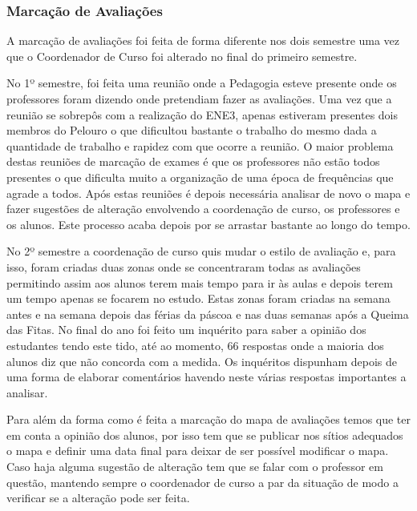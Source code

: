 
\subsubsection{Marcação de Avaliações}

A marcação de avaliações foi feita de forma diferente nos dois semestre uma vez que o Coordenador de Curso foi alterado no final do primeiro semestre.

No 1º semestre, foi feita uma reunião onde a Pedagogia esteve presente onde os professores foram dizendo onde pretendiam fazer as avaliações. Uma vez que a reunião se sobrepôs com a realização do ENE3, apenas estiveram presentes dois membros do Pelouro o que dificultou bastante o trabalho do mesmo dada a quantidade de trabalho e rapidez com que ocorre a reunião. O maior problema destas reuniões de marcação de exames é que os professores não estão todos presentes o que dificulta muito a organização de uma época de frequências que agrade a todos. Após estas reuniões é depois necessária analisar de novo o mapa e fazer sugestões de alteração envolvendo a coordenação de curso, os professores e os alunos. Este processo acaba depois por se arrastar bastante ao longo do tempo.

No 2º semestre a coordenação de curso quis mudar o estilo de avaliação e, para isso, foram criadas duas zonas onde se concentraram todas as avaliações permitindo assim aos alunos terem mais tempo para ir às aulas e depois terem um tempo apenas se focarem no estudo. Estas zonas foram criadas na semana antes e na semana depois das férias da páscoa e nas duas semanas após a Queima das Fitas. No final do ano foi feito um inquérito para saber a opinião dos estudantes tendo este tido, até ao momento, 66 respostas onde a maioria dos alunos diz que não concorda com a medida. Os inquéritos dispunham depois de uma forma de elaborar comentários havendo neste várias respostas importantes a analisar.

Para além da forma como é feita a marcação do mapa de avaliações temos que ter em conta a opinião dos alunos, por isso tem que se publicar nos sítios adequados o mapa e definir uma data final para deixar de ser possível modificar o mapa. Caso haja alguma sugestão de alteração tem que se falar com o professor em questão, mantendo sempre o coordenador de curso a par da situação de modo a verificar se a alteração pode ser feita.